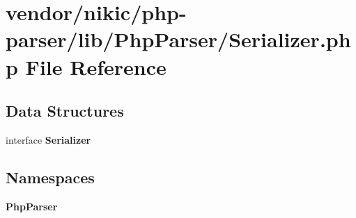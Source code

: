 \section{vendor/nikic/php-\/parser/lib/\+Php\+Parser/\+Serializer.php File Reference}
\label{nikic_2php-parser_2lib_2_php_parser_2_serializer_8php}
\subsection*{Data Structures}
\begin{DoxyCompactItemize}
\item 
interface {\bf Serializer}
\end{DoxyCompactItemize}
\subsection*{Namespaces}
\begin{DoxyCompactItemize}
\item 
 {\bf Php\+Parser}
\end{DoxyCompactItemize}

